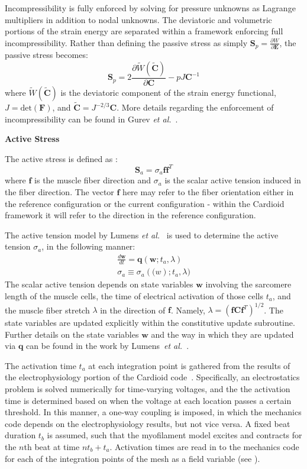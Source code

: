 Incompressibility is fully enforced by solving for pressure unknowns as Lagrange multipliers in addition to nodal unknowns. The deviatoric and volumetric portions of the strain energy are separated within a framework enforcing full incompressibility. Rather than defining the passive stress as simply $\bm{S}_p = \frac{\partial W}{\partial \bm{E}}$, the passive stress becomes:
\begin{equation}
\bm{S}_p= 2\frac{\partial{\tilde{W}(\tilde{\bm{C}})}}{\partial{\bm{C}}} - pJ\bm{C}^{-1}
\end{equation}
where $\tilde{W}(\tilde{\bm{C}})$ is the deviatoric component of the strain energy functional, $J = \text{det}(\bm{F})$, and $\tilde{\bm{C}} = J^{-2/3}\bm{C}$. More details regarding the enforcement of incompressibility can be found in Gurev \textit{et al.}~\cite{gurev_2015}.

\textbf{Active Stress}

The active stress is defined as :
\begin{equation}
\bm{S}_a = \sigma_a \bm{f} \bm{f}^{T}
\label{eqn:active}
\end{equation}
where $\bm{f}$ is the muscle fiber direction and ${\sigma_a}$ is the scalar active tension induced in the fiber direction. The vector $\bm{f}$ here may refer to the fiber orientation either in the reference configuration or the current configuration - within the Cardioid framework it will refer to the direction in the reference configuration.

The active tension model by Lumens \textit{et al.}~\cite{lumens_2009} is used to determine the active tension $\sigma_a$, in the following manner:
\begin{align}
\frac{d\bm{w}}{dt} = \bm{q}(\bm{w}; t_a, \lambda) \\
\sigma_a \equiv \sigma_a(\bm(w); t_a, \lambda)
\end{align}
The scalar active tension depends on state variables $\bm{w}$ involving the sarcomere length of the muscle cells, the time of electrical activation of those cells $t_a$, and the muscle fiber stretch $\lambda$ in the direction of $\bm{f}$. Namely, $\lambda = (\bm{f}\bm{C}\bm{f}^T)^{1/2}$. The state variables are updated explicitly within the constitutive update subroutine. Further details on the state variables $\bm{w}$ and the way in which they are updated via $\bm{q}$ can be found in the work by Lumens~\textit{et al.}~\cite{lumens_2009}.

The activation time $t_a$ at each integration point is gathered from the results of the electrophysiology portion of the Cardioid code~\cite{richards_2013}. Specifically, an electrostatics problem is solved numerically for time-varying voltages, and the the activation time is determined based on when the voltage at each location passes a certain threshold. In this manner, a one-way coupling is imposed, in which the mechanics code depends on the electrophysiology results, but not vice versa. A fixed beat duration $t_b$ is assumed, such that the myofilament model excites and contracts for the $n$th beat at time $nt_b + t_a$. Activation times are read in to the mechanics code for each of the integration points of the mesh as a field variable (see ).

